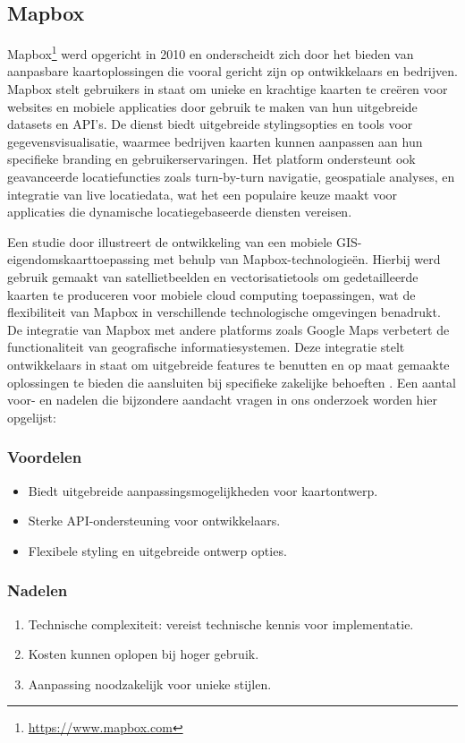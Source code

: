 \subsection{Mapbox}
Mapbox\footnote{\url{https://www.mapbox.com}} werd opgericht in 2010 en onderscheidt zich door het bieden van aanpasbare kaartoplossingen die vooral gericht zijn op ontwikkelaars en bedrijven. Mapbox stelt gebruikers in staat om unieke en krachtige kaarten te creëren voor websites en mobiele applicaties door gebruik te maken van hun uitgebreide datasets en API's. De dienst biedt uitgebreide stylingsopties en tools voor gegevensvisualisatie, waarmee bedrijven kaarten kunnen aanpassen aan hun specifieke branding en gebruikerservaringen. Het platform ondersteunt ook geavanceerde locatiefuncties zoals turn-by-turn navigatie, geospatiale analyses, en integratie van live locatiedata, wat het een populaire keuze maakt voor applicaties die dynamische locatiegebaseerde diensten vereisen. 

Een studie door \textcite{Neene2017} illustreert de ontwikkeling van een mobiele GIS-eigendomskaarttoepassing met behulp van Mapbox-technologieën. Hierbij werd gebruik gemaakt van satellietbeelden en vectorisatietools om gedetailleerde kaarten te produceren voor mobiele cloud computing toepassingen, wat de flexibiliteit van Mapbox in verschillende technologische omgevingen benadrukt. De integratie van Mapbox met andere platforms zoals Google Maps verbetert de functionaliteit van geografische informatiesystemen. Deze integratie stelt ontwikkelaars in staat om uitgebreide features te benutten en op maat gemaakte oplossingen te bieden die aansluiten bij specifieke zakelijke behoeften \autocite{Hidayatulloh2023}. Een aantal voor- en nadelen die bijzondere aandacht vragen in ons onderzoek worden hier opgelijst:

\subsubsection*{Voordelen}
\begin{itemize}
    \item Biedt uitgebreide aanpassingsmogelijkheden voor kaartontwerp.
    \item Sterke API-ondersteuning voor ontwikkelaars.
    \item Flexibele styling en uitgebreide ontwerp opties.
\end{itemize}
\subsubsection*{Nadelen}
\begin{enumerate}
    \item Technische complexiteit: vereist technische kennis voor implementatie.
    \item Kosten kunnen oplopen bij hoger gebruik.
    \item Aanpassing noodzakelijk voor unieke stijlen.
\end{enumerate}


